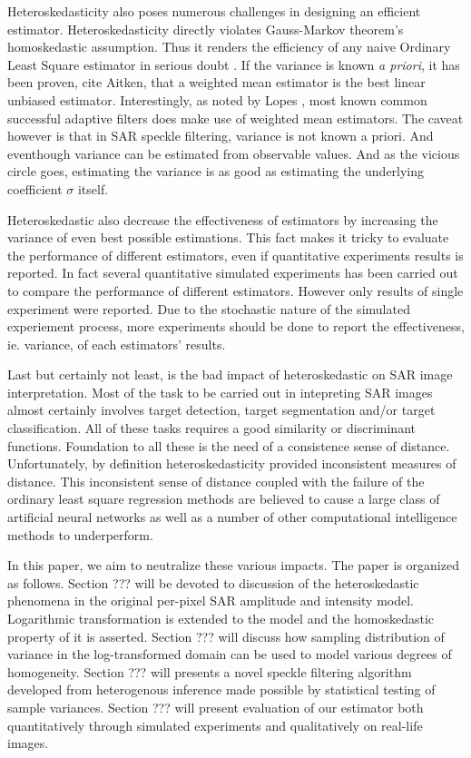 \documentclass[journal]{IEEEtran}
\begin{document}
Heteroskedasticity also poses numerous challenges in designing an efficient estimator. Heteroskedasticity directly violates Gauss-Markov theorem's homoskedastic assumption. Thus it renders the efficiency of any naive Ordinary Least Square estimator in serious doubt \cite{Furno_1991_JStatCompSimul}. If the variance is known \textit{a priori}, it has been proven, cite Aitken, that a weighted mean estimator is the best linear unbiased estimator. Interestingly, as noted by Lopes \cite{Lopes_TGRS_1990}, most known common successful adaptive filters \cite{Lee_PAMI_1980} \cite{Kuan_1985_PAMI} \cite{Frost_PAMI_1982} does make use of weighted mean estimators. The caveat however is that in SAR speckle filtering, variance is not known a priori. And eventhough variance can be estimated from observable values. And as the vicious circle goes, estimating the variance is as good as estimating the underlying coefficient $\sigma$ itself.

Heteroskedastic also decrease the effectiveness of estimators by increasing the variance of even best possible estimations. This fact makes it tricky to evaluate the performance of different estimators, even if quantitative experiments results is reported. In fact several quantitative simulated experiments has been carried out to compare the performance of different estimators\cite{Lee_TGRS_2009}. However only results of single experiment were reported. Due to the stochastic nature of the simulated experiement process, more experiments should be done to report the effectiveness, ie. variance, of each estimators' results.

Last but certainly not least, is the bad impact of heteroskedastic on SAR image interpretation. Most of the task to be carried out in intepreting SAR images almost certainly involves target detection, target segmentation and/or target classification. All of these tasks requires a good similarity or discriminant functions. Foundation to all these is the need of a consistence sense of distance. Unfortunately, by definition heteroskedasticity provided inconsistent measures of distance. This inconsistent sense of distance coupled with the failure of the ordinary least square regression methods are believed to cause a large class of artificial neural networks as well as a number of other computational intelligence methods to underperform.

In this paper, we aim to neutralize these various impacts. The paper is organized as follows. Section ??? will be devoted to discussion of the heteroskedastic phenomena in the original per-pixel SAR amplitude and intensity model. Logarithmic transformation is extended to the model and the homoskedastic property of it is asserted. Section ??? will discuss how sampling distribution of variance in the log-transformed domain can be used to model various degrees of homogeneity. Section ??? will presents a novel speckle filtering algorithm developed from heterogenous inference made possible by statistical testing of sample variances. Section ??? will present evaluation of our estimator both quantitatively through simulated experiments and qualitatively on real-life images.
\end{document}
